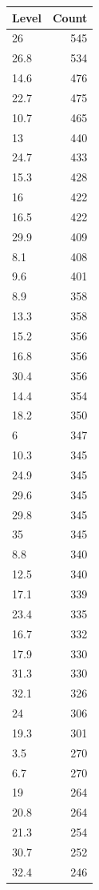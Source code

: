 \begin{table}[ht]
\centering
\begin{tabular}{lr}
  \hline
Level & Count \\ 
  \hline
26 & 545 \\ 
  26.8 & 534 \\ 
  14.6 & 476 \\ 
  22.7 & 475 \\ 
  10.7 & 465 \\ 
  13 & 440 \\ 
  24.7 & 433 \\ 
  15.3 & 428 \\ 
  16 & 422 \\ 
  16.5 & 422 \\ 
  29.9 & 409 \\ 
  8.1 & 408 \\ 
  9.6 & 401 \\ 
  8.9 & 358 \\ 
  13.3 & 358 \\ 
  15.2 & 356 \\ 
  16.8 & 356 \\ 
  30.4 & 356 \\ 
  14.4 & 354 \\ 
  18.2 & 350 \\ 
  6 & 347 \\ 
  10.3 & 345 \\ 
  24.9 & 345 \\ 
  29.6 & 345 \\ 
  29.8 & 345 \\ 
  35 & 345 \\ 
  8.8 & 340 \\ 
  12.5 & 340 \\ 
  17.1 & 339 \\ 
  23.4 & 335 \\ 
  16.7 & 332 \\ 
  17.9 & 330 \\ 
  31.3 & 330 \\ 
  32.1 & 326 \\ 
  24 & 306 \\ 
  19.3 & 301 \\ 
  3.5 & 270 \\ 
  6.7 & 270 \\ 
  19 & 264 \\ 
  20.8 & 264 \\ 
  21.3 & 254 \\ 
  30.7 & 252 \\ 
  32.4 & 246 \\ 

\end{tabular}
\end{table}
